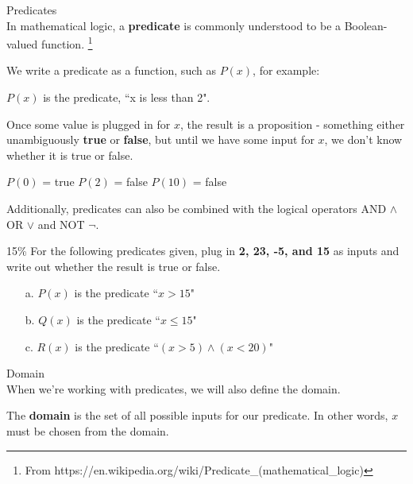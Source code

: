 \documentclass[a4paper,12pt]{book}
\begin{document}
        \begin{intro}{Predicates\\}
            In mathematical logic, a \textbf{predicate} is commonly understood to be a Boolean-valued function.
            \footnote{From https://en.wikipedia.org/wiki/Predicate\_(mathematical\_logic)}

            We write a predicate as a function, such as $P(x)$, for example:

            \begin{center}
                $P(x)$ is the predicate, ``x is less than 2".
            \end{center}

            Once some value is plugged in for $x$, the result is a proposition -
            something either unambiguously \textbf{true} or \textbf{false},
            but until we have some input for $x$, we don't know whether it
            is true or false.

            \begin{center}
                $P(0)$ = true \tab $P(2)$ = false \tab $P(10)$ = false
            \end{center}

            Additionally, predicates can also be combined with the logical
            operators AND $\land$ OR $\lor$ and NOT $\neg$.
        \end{intro}

        \newpage
        \begin{question}{1}{15\%}
            For the following predicates given, plug in \textbf{2, 23, -5, and 15}
            as inputs and write out whether the result is true or false.
        \end{question}

        \begin{enumerate}
            \item[a.] $P(x)$ is the predicate ``$x > 15$"
            \item[b.] $Q(x)$ is the predicate ``$x \leq 15$"
            \item[c.] $R(x)$ is the predicate ``$(x > 5) \land (x < 20)$"
        \end{enumerate}

        \begin{intro}{Domain\\}
        When we're working with predicates, we will also define the domain.

        The \textbf{domain} is the set of all possible inputs for our predicate.
        In other words, $x$ must be chosen from the domain.
        \end{intro}
        
\end{document}
